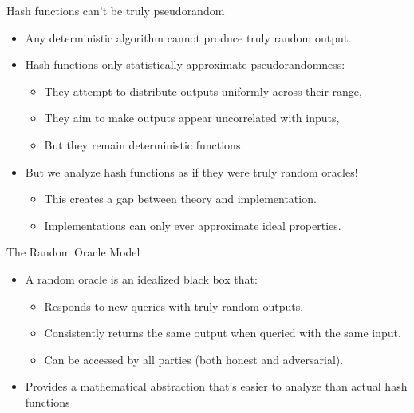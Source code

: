 \documentclass[aspectratio=169, lualatex, handout]{beamer}
\begin{document}
\begin{frame}{Hash functions can't be truly pseudorandom}
	\begin{itemize}
		\item Any deterministic algorithm cannot produce truly random output.
		\item Hash functions only statistically approximate pseudorandomness:
		      \begin{itemize}
			      \item They attempt to distribute outputs uniformly across their range,
			      \item They aim to make outputs appear uncorrelated with inputs,
			      \item But they remain deterministic functions.
		      \end{itemize}
		\item But we analyze hash functions as if they were truly random oracles!
		      \begin{itemize}
			      \item This creates a gap between theory and implementation.
			      \item Implementations can only ever approximate ideal properties.
		      \end{itemize}
	\end{itemize}
\end{frame}

\begin{frame}{The Random Oracle Model}
	\begin{itemize}
		\item A random oracle is an idealized black box that:
		      \begin{itemize}
			      \item Responds to new queries with truly random outputs.
			      \item Consistently returns the same output when queried with the same input.
			      \item Can be accessed by all parties (both honest and adversarial).
		      \end{itemize}
		\item Provides a mathematical abstraction that's easier to analyze than actual hash functions
	\end{itemize}
\end{frame}
\end{document}

